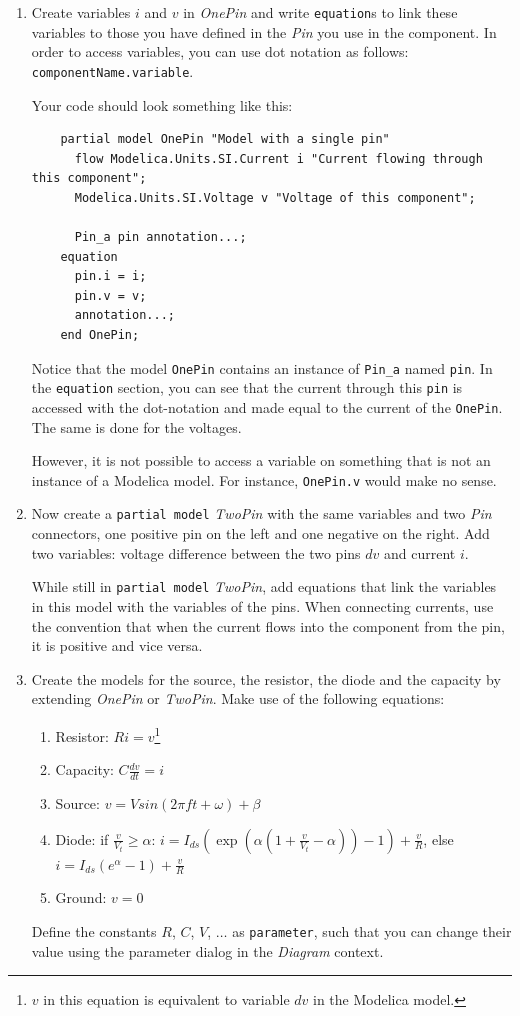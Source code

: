 \documentclass[10pt,a4paper]{article}
\begin{document}
\begin{enumerate}
	\item Create variables $i$ and $v$ in \textit{OnePin} and write \texttt{equation}s to link these variables to those you have defined in the \textit{Pin} you use in the component. In order to access variables, you can use dot notation as follows: \texttt{componentName.variable}.
	
	Your code should look something like this:
	\begin{lstlisting}
	partial model OnePin "Model with a single pin"
	  flow Modelica.Units.SI.Current i "Current flowing through this component";
	  Modelica.Units.SI.Voltage v "Voltage of this component";
	
	  Pin_a pin annotation...;
	equation
	  pin.i = i;
	  pin.v = v;
	  annotation...;
	end OnePin;
	\end{lstlisting}

	Notice that the model \texttt{OnePin} contains an instance of \texttt{Pin\_a} named \texttt{pin}. In the \texttt{equation} section, you can see that the current through this \texttt{pin} is accessed with the dot-notation and made equal to the current of the \texttt{OnePin}. The same is done for the voltages.
	
	However, it is not possible to access a variable on something that is not an instance of a Modelica model. For instance, \texttt{OnePin.v} would make no sense.
	
	\item Now create a \texttt{partial model} \textit{TwoPin} with the same variables and two \textit{Pin} connectors, one positive pin on the left and one negative on the right. Add two variables: voltage difference between the two pins $dv$ and current $i$. 
	
	While still in \texttt{partial model} \textit{TwoPin}, add equations that link the variables in this model with the variables of the pins. When connecting currents, use the convention that when the current flows into the component from the pin, it is positive and vice versa.
	
	\item Create the models for the source, the resistor, the diode and the capacity by extending \textit{OnePin} or \textit{TwoPin}. Make use of the following equations:
	\begin{enumerate}
		\item Resistor: $R i = v$\footnote{$v$ in this equation is equivalent to variable $dv$ in the Modelica model.}
		\item Capacity: $C \frac{d v}{dt} = i$
		\item Source: $v = V sin( 2 \pi f t + \omega) + \beta$
		\item Diode: if $ \frac{v}{V_t} \geq \alpha$: $i = I_{ds} \left( \exp\left(\alpha \left( 1 + \frac{v}{V_t} - \alpha \right)\right) - 1\right) + \frac{v}{R}$, else $i = I_{ds} (e^\alpha - 1) + \frac{v}{R}$
		\item Ground: $ v = 0$
	\end{enumerate}
	Define the constants $R$, $C$, $V$, $\ldots$  as \texttt{parameter}, such that you can change their value using the parameter dialog in the \textit{Diagram} context.
	

\end{enumerate}
\end{document}

